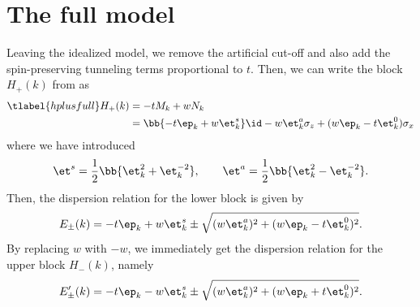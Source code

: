 

\section{The full model}
Leaving the idealized model, we remove the artificial cut-off and also add the spin-preserving tunneling terms proportional to $t$.
Then, we can write the block $H_+(k)$ from  as
\begin{align} \tlabel{hplusfull}
    H_+(k) &= -t M_k + w N_k \\
           &= \bb{-t \ep_k + w \et^{s}_k} \id - w\et^{a}_k \sigma_z + (w \ep_k - t \et^0_k) \sigma_x
\end{align}
where we have introduced
\begin{align}
    \et^s = \frac{1}{2} \bb{ \et^2_k + \et^{-2}_{k} }, \qquad
    \et^a = \frac{1}{2} \bb{ \et^2_k - \et^{-2}_{k} }.
\end{align}
Then, the dispersion relation for the lower block is given by
\begin{align}
    E_\pm(k) = -t \ep_k + w \et^s_k \pm \sqrt{(w \et^a_k)^2+(w \ep_k - t \et^0_k)^2}.
\end{align}
By replacing $w$ with $-w$, we immediately get the dispersion relation for the upper block $H_-(k)$, namely
\begin{align}
    E'_\pm(k) = -t \ep_k - w \et^s_k \pm \sqrt{(w \et^a_k)^2+(w \ep_k + t \et^0_k)^2}.
\end{align}

